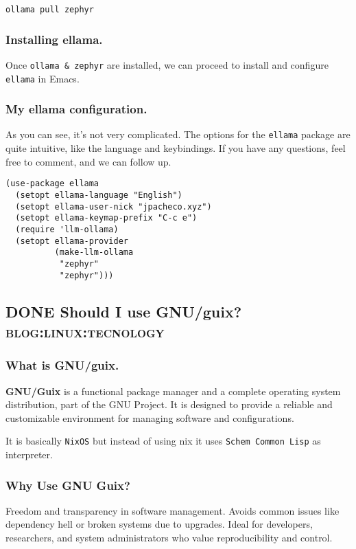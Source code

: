 \documentclass[11pt]{article}
\begin{document}
\begin{verbatim}
ollama pull zephyr
\end{verbatim}
\subsubsection{Installing ellama.}
\label{sec:org3dc5f6c}
Once \texttt{ollama \& zephyr} are installed, we can proceed to install and configure \texttt{ellama} in Emacs.
\subsubsection{My ellama configuration.}
\label{sec:orgbdf1a51}
As you can see, it's not very complicated. The options for the \texttt{ellama} package are quite intuitive, like the language and keybindings. If you have any questions, feel free to comment, and we can follow up.

\begin{verbatim}
(use-package ellama
  (setopt ellama-language "English")
  (setopt ellama-user-nick "jpacheco.xyz")
  (setopt ellama-keymap-prefix "C-c e")
  (require 'llm-ollama)
  (setopt ellama-provider
          (make-llm-ollama
           "zephyr"
           "zephyr")))
\end{verbatim}
\subsection{{\bfseries\sffamily DONE} Should I use GNU/guix?\hfill{}\textsc{blog:linux:tecnology}}
\label{sec:org8bdc8a0}
\subsubsection{What is GNU/guix.}
\label{sec:org5f3529b}
\textbf{GNU/Guix} is a functional package manager and a complete operating system distribution, part of the GNU Project. It is designed to provide a reliable and customizable environment for managing software and configurations.

It is basically \texttt{NixOS} but instead of using nix it uses \texttt{Schem Common Lisp} as interpreter.
\subsubsection{Why Use GNU Guix?}
\label{sec:org4d52261}
Freedom and transparency in software management.
Avoids common issues like dependency hell or broken systems due to upgrades.
Ideal for developers, researchers, and system administrators who value reproducibility and control.
\end{document}
